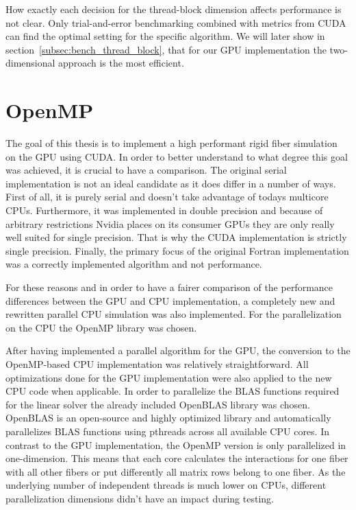 \documentclass[a4paper,11pt]{kth-mag}
\begin{document}
How exactly each decision for the thread-block dimension affects performance is not clear. Only trial-and-error benchmarking combined with metrics from CUDA can find the optimal setting for the specific algorithm. We will later show in section~\ref{subsec:bench_thread_block}, that for our GPU implementation the two-dimensional approach is the most efficient.

\section{OpenMP}

The goal of this thesis is to implement a high performant rigid fiber simulation on the GPU using CUDA. In order to better understand to what degree this goal was achieved, it is crucial to have a comparison. The original serial implementation is not an ideal candidate as it does differ in a number of ways. First of all, it is purely serial and doesn't take advantage of todays multicore CPUs. Furthermore, it was implemented in double precision and because of arbitrary restrictions Nvidia places on its consumer GPUs they are only really well suited for single precision. That is why the CUDA implementation is strictly single precision. Finally, the primary focus of the original Fortran implementation was a correctly implemented algorithm and not performance.

For these reasons and in order to have a fairer comparison of the performance differences between the GPU and CPU implementation, a completely new and rewritten parallel CPU simulation was also implemented. For the parallelization on the CPU the OpenMP library was chosen.

After having implemented a parallel algorithm for the GPU, the conversion to the OpenMP-based CPU implementation was relatively straightforward. All optimizations done for the GPU implementation were also applied to the new CPU code when applicable. In order to parallelize the BLAS functions required for the linear solver the already included OpenBLAS library was chosen. OpenBLAS is an open-source and highly optimized library and automatically parallelizes BLAS functions using pthreads across all available CPU cores. In contrast to the GPU implementation, the OpenMP version is only parallelized in one-dimension. This means that each core calculates the interactions for one fiber with all other fibers or put differently all matrix rows belong to one fiber. As the underlying number of independent threads is much lower on CPUs, different parallelization dimensions didn't have an impact during testing.
\end{document}
